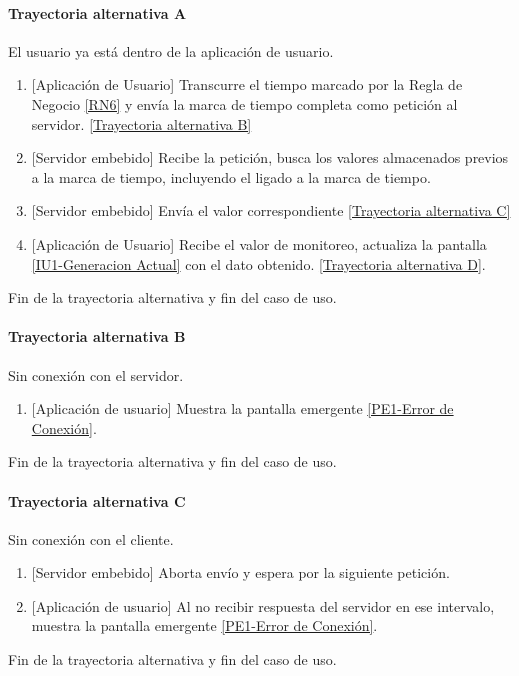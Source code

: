\paragraph{Trayectoria alternativa A} \label{SUB-U-CU1.2:TA}
	El usuario ya está dentro de la aplicación de usuario.
	\begin{enumerate}[label=A\arabic*.]
		\item {[Aplicación de Usuario]} Transcurre el tiempo marcado por la Regla de Negocio \ref{RN6} y envía la marca de tiempo completa como petición al servidor. \hyperref[SUB-U-CU1.2:TB]{[Trayectoria alternativa B]} 
		\item {[Servidor embebido]} Recibe la petición, busca los valores almacenados previos a la marca de tiempo, incluyendo el ligado a la marca de tiempo.
		\item  {[Servidor embebido]} Envía el valor correspondiente \hyperref[SUB-U-CU1.2:TC]{[Trayectoria alternativa C]}
        \item {[Aplicación de Usuario]} Recibe el valor de monitoreo, actualiza la pantalla \hyperref[fig:monitoreo]{[IU1-Generacion Actual]} con el dato obtenido.
        \hyperref[SUB-U-CU1.2:TD]{[Trayectoria alternativa D]}.
	\end{enumerate}
	Fin de la trayectoria alternativa y fin del caso de uso.

\paragraph{Trayectoria alternativa B} \label{SUB-U-CU1.2:TB}
	Sin conexión con el servidor.
	\begin{enumerate}[label=B\arabic*.]
		\item {[Aplicación de usuario]} Muestra la pantalla emergente \hyperref[fig:Error de Conexion]{[PE1-Error de Conexión]}.
	\end{enumerate}
	Fin de la trayectoria alternativa y fin del caso de uso.


\paragraph{Trayectoria alternativa C} \label{SUB-U-CU1.2:TC}
	Sin conexión con el cliente.
	\begin{enumerate}[label=C\arabic*.]
		\item {[Servidor embebido]} Aborta envío y espera por la siguiente petición.
		\item {[Aplicación de usuario]} Al no recibir respuesta del servidor en ese intervalo, muestra la pantalla emergente \hyperref[fig:Error de Conexion]{[PE1-Error de Conexión]}.
	\end{enumerate}
	Fin de la trayectoria alternativa y fin del caso de uso.
	

